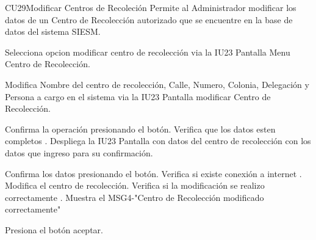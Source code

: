 \begin{UseCase}{CU29}{Modificar Centros de Recoleción}{
		Permite al Administrador modificar los datos de un Centro de Recolección autorizado que se encuentre en la base de datos del sistema SIESM.\\
		
}
	
\end{UseCase}



\begin{UCtrayectoria}
	\item\UCactor Selecciona opcion modificar centro de recolección via la IU23 Pantalla Menu Centro de Recolección.
	\item\UCactor Modifica Nombre del centro de recolección, Calle, Numero, Colonia, Delegación y Persona a cargo en el sistema via la IU23 Pantalla modificar Centro de Recolección.
	\item\UCactor Confirma la operación presionando el botón.
	\UCpaso Verifica que los datos esten completos .
	\UCpaso Despliega la IU23 Pantalla con datos del centro de recolección con los datos que ingreso para su confirmación.
	\item\UCactor Confirma los datos presionando el botón.
	\UCpaso Verifica si existe conexión a internet .
	\UCpaso Modifica el centro de recolección.
	\UCpaso Verifica si la modificación se realizo correctamente .
	\UCpaso Muestra el MSG4-"Centro de Recolección modificado correctamente"
	\item\UCactor Presiona el botón aceptar.
\end{UCtrayectoria}


